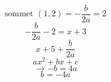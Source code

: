 \documentclass{article}
\begin{document}
\[ \text{sommet } (1, 2) = -\frac{b}{2a} = 2\]
\[ -\frac{b}{2a} - 2 = x + 3 \]
\[ x + 5 + \frac{b}{2a}\]
\[ ax^2 + bx + c \]
\[ \rightarrow -b = 4a \]
\[ b = -4a \]
\end{document}
